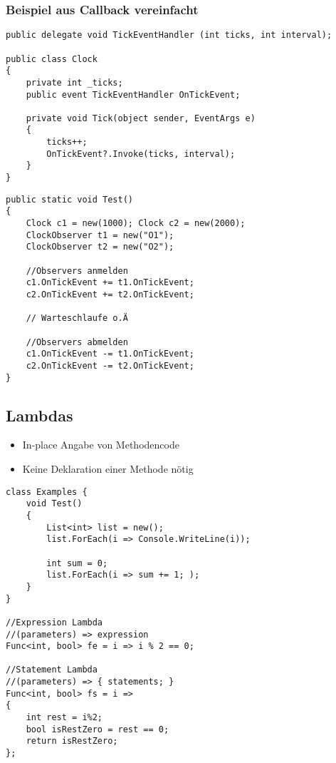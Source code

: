 \begin{multicols*}{2}
\subsubsection{Beispiel aus Callback vereinfacht}
\begin{lstlisting}
public delegate void TickEventHandler (int ticks, int interval);

public class Clock
{
    private int _ticks;
    public event TickEventHandler OnTickEvent;

    private void Tick(object sender, EventArgs e)
    {
        ticks++;
        OnTickEvent?.Invoke(ticks, interval);
    }
}
\end{lstlisting}
\begin{lstlisting}
public static void Test()
{
    Clock c1 = new(1000); Clock c2 = new(2000);
    ClockObserver t1 = new("O1");
    ClockObserver t2 = new("O2");
    
    //Observers anmelden
    c1.OnTickEvent += t1.OnTickEvent; 
    c2.OnTickEvent += t2.OnTickEvent;
    
    // Warteschlaufe o.Ä
    
    //Observers abmelden
    c1.OnTickEvent -= t1.OnTickEvent;
    c2.OnTickEvent -= t2.OnTickEvent;
}
\end{lstlisting}

\subsection{Lambdas}
\begin{itemize}
    \item In-place Angabe von Methodencode
    \item Keine Deklaration einer Methode nötig
\end{itemize}
\begin{lstlisting}
class Examples {
    void Test()
    {
        List<int> list = new();
        list.ForEach(i => Console.WriteLine(i));
        
        int sum = 0;
        list.ForEach(i => sum += 1; );
    }
}

//Expression Lambda
//(parameters) => expression
Func<int, bool> fe = i => i % 2 == 0;

//Statement Lambda
//(parameters) => { statements; } 
Func<int, bool> fs = i =>
{
    int rest = i%2;
    bool isRestZero = rest == 0;
    return isRestZero;
};
\end{lstlisting}

\end{multicols*}
